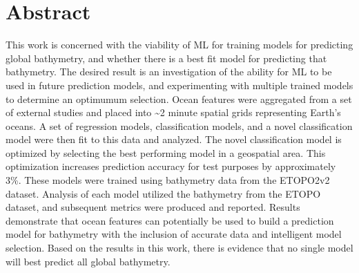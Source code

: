 \section{Abstract}
\setlength{\parindent}{10ex}
This work is concerned with the viability of \ac{ML} for training models  for predicting global bathymetry, and whether there is a best fit model for predicting that bathymetry.
The desired result is an investigation of the ability for \ac{ML} to be used in future prediction models, and experimenting with multiple trained models to determine an optimumum selection.
Ocean features were aggregated from a set of external studies and placed into \~{}2 minute spatial grids representing Earth's oceans.
A set of regression models, classification models, and a novel classification model were then fit to this data and analyzed.
The novel classification model is optimized by selecting the best performing model in a geospatial area.
This optimization increases prediction accuracy for test purposes by approximately 3\%.
These models were trained using bathymetry data from the ETOPO2v2 dataset.
Analysis of each model utilized the bathymetry from the ETOPO dataset, and subsequent metrics were produced and reported.
Results demonstrate that ocean features can potentially be used to build a prediction model for bathymetry with the inclusion of accurate data and intelligent model selection.
Based on the results in this work, there is evidence that no single model will best predict all global bathymetry.
